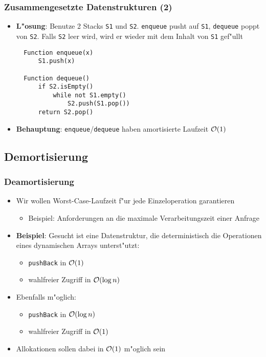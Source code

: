 \begin{frame}[fragile]
  \frametitle{Zusammengesetzte Datenstrukturen (2)}
  \begin{itemize}
  \item \textbf{L"osung}: Benutze 2 Stacks \lstinline|S1| und \lstinline|S2|.
        \lstinline|enqueue| pusht auf \lstinline|S1|, \lstinline|dequeue| poppt von
        \lstinline|S2|. Falls \lstinline|S2| leer wird, wird er wieder mit dem Inhalt
        von \lstinline|S1| gef"ullt

  \begin{lstlisting}
  Function enqueue(x)
      S1.push(x)

  Function dequeue()
      if S2.isEmpty()
          while not S1.empty()
              S2.push(S1.pop())
      return S2.pop()
  \end{lstlisting}

  \item \textbf{Behauptung}: \lstinline|enqueue|/\lstinline|dequeue| haben amortisierte
                             Laufzeit $\mathcal{O}(1)$
  \end{itemize}
\end{frame}

\subsection{Demortisierung}
\begin{frame}
  \frametitle{Deamortisierung}
  \begin{itemize}
  \item Wir wollen Worst-Case-Laufzeit f"ur jede Einzeloperation garantieren
    \begin{itemize}
    \item Beispiel: Anforderungen an die maximale Verarbeitungszeit einer Anfrage
    \end{itemize}
  \item \textbf{Beispiel}: Gesucht ist eine Datenstruktur,
        die deterministisch die Operationen eines dynamischen Arrays unterst"utzt:
    \begin{itemize}
    \item \lstinline|pushBack| in $\mathcal{O}(1)$
    \item wahlfreier Zugriff in $\mathcal{O}(\log n)$
    \end{itemize}
  \item Ebenfalls m"oglich:
    \begin{itemize}
    \item \lstinline|pushBack| in $\mathcal{O}(\log n)$
    \item wahlfreier Zugriff in $\mathcal{O}(1)$
    \end{itemize}
  \item Allokationen sollen dabei in $\mathcal{O}(1)$ m"oglich sein
  \end{itemize}
\end{frame}


